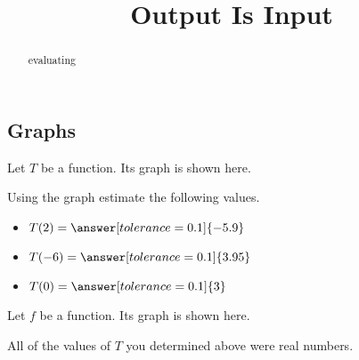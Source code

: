 \documentclass{ximera}
\title{Output Is Input}
\begin{document}
\begin{abstract}
evaluating
\end{abstract}
\maketitle











\subsection*{Graphs}

Let $T$ be a function.  Its graph is shown here.




\begin{center}
\end{center}




\begin{question}


Using the graph estimate the following values.


\begin{itemize}

\item $T(2) = \answer[tolerance=0.1]{-5.9}$ \\

\item $T(-6) = \answer[tolerance=0.1]{3.95}$ \\

\item $T(0) = \answer[tolerance=0.1]{3}$ \\

\end{itemize}


\end{question}



Let $f$ be a function.  Its graph is shown here. 



\begin{center}
\end{center}







All of the values of $T$ you determined above were real numbers. 
\end{document}
